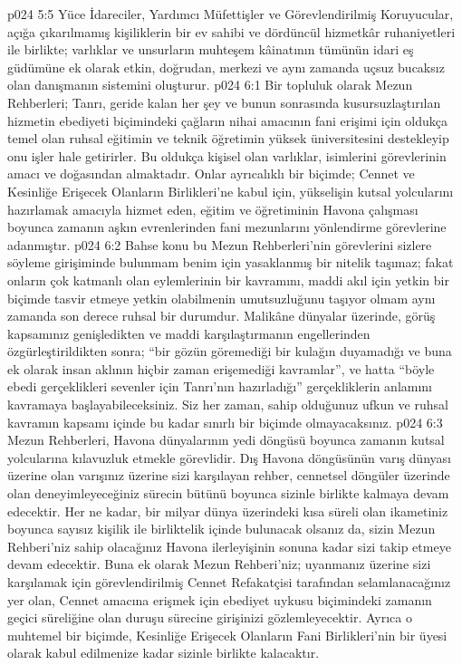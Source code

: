 \vs p024 5:5 Yüce İdareciler, Yardımcı Müfettişler ve Görevlendirilmiş Koruyucular, açığa çıkarılmamış kişiliklerin bir ev sahibi ve dördüncül hizmetkâr ruhaniyetleri ile birlikte; varlıklar ve unsurların muhteşem kâinatının tümünün idari eş güdümüne ek olarak etkin, doğrudan, merkezi ve aynı zamanda uçsuz bucaksız olan danışmanın sistemini oluşturur.
\vs p024 6:1 Bir topluluk olarak Mezun Rehberleri; Tanrı, geride kalan her şey ve bunun sonrasında kusursuzlaştırılan hizmetin ebediyeti biçimindeki çağların nihai amacının fani erişimi için oldukça temel olan ruhsal eğitimin ve teknik öğretimin yüksek üniversitesini destekleyip onu işler hale getirirler. Bu oldukça kişisel olan varlıklar, isimlerini görevlerinin amacı ve doğasından almaktadır. Onlar ayrıcalıklı bir biçimde; Cennet ve Kesinliğe Erişecek Olanların Birlikleri’ne kabul için, yükselişin kutsal yolcularını hazırlamak amacıyla hizmet eden, eğitim ve öğretiminin Havona çalışması boyunca zamanın aşkın evrenlerinden fani mezunlarını yönlendirme görevlerine adanmıştır.
\vs p024 6:2 Bahse konu bu Mezun Rehberleri’nin görevlerini sizlere söyleme girişiminde bulunmam benim için yasaklanmış bir nitelik taşımaz; fakat onların çok katmanlı olan eylemlerinin bir kavramını, maddi akıl için yetkin bir biçimde tasvir etmeye yetkin olabilmenin umutsuzluğunu taşıyor olmam aynı zamanda son derece ruhsal bir durumdur. Malikâne dünyalar üzerinde, görüş kapsamınız genişledikten ve maddi karşılaştırmanın engellerinden özgürleştirildikten sonra; “bir gözün göremediği bir kulağın duyamadığı ve buna ek olarak insan aklının hiçbir zaman erişemediği kavramlar”, ve hatta “böyle ebedi gerçeklikleri sevenler için Tanrı’nın hazırladığı” gerçekliklerin anlamını kavramaya başlayabileceksiniz. Siz her zaman, sahip olduğunuz ufkun ve ruhsal kavramın kapsamı içinde bu kadar sınırlı bir biçimde olmayacaksınız.
\vs p024 6:3 Mezun Rehberleri, Havona dünyalarının yedi döngüsü boyunca zamanın kutsal yolcularına kılavuzluk etmekle görevlidir. Dış Havona döngüsünün varış dünyası üzerine olan varışınız üzerine sizi karşılayan rehber, cennetsel döngüler üzerinde olan deneyimleyeceğiniz sürecin bütünü boyunca sizinle birlikte kalmaya devam edecektir. Her ne kadar, bir milyar dünya üzerindeki kısa süreli olan ikametiniz boyunca sayısız kişilik ile birliktelik içinde bulunacak olsanız da, sizin Mezun Rehberi’niz sahip olacağınız Havona ilerleyişinin sonuna kadar sizi takip etmeye devam edecektir. Buna ek olarak Mezun Rehberi’niz; uyanmanız üzerine sizi karşılamak için görevlendirilmiş Cennet Refakatçisi tarafından selamlanacağınız yer olan, Cennet amacına erişmek için ebediyet uykusu biçimindeki zamanın geçici süreliğine olan duruşu sürecine girişinizi gözlemleyecektir. Ayrıca o muhtemel bir biçimde, Kesinliğe Erişecek Olanların Fani Birlikleri’nin bir üyesi olarak kabul edilmenize kadar sizinle birlikte kalacaktır.
